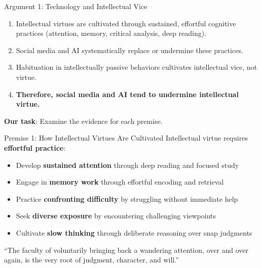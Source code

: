 ﻿\documentclass[aspectratio=169,11pt]{beamer}
\begin{document}
\begin{frame}{Argument 1: Technology and Intellectual Vice}
\begin{argumentbox}
\begin{enumerate}
    \item Intellectual virtues are cultivated through sustained, effortful cognitive practices (attention, memory, critical analysis, deep reading).
    \item Social media and AI systematically replace or undermine these practices.
    \item Habituation in intellectually passive behaviors cultivates intellectual vice, not virtue.
    \item[\textbf{C.}] \textbf{Therefore, social media and AI tend to undermine intellectual virtue.}
\end{enumerate}
\end{argumentbox}

\vspace{0.3cm}
\textbf{Our task}: Examine the evidence for each premise.
\end{frame}

\begin{frame}{Premise 1: How Intellectual Virtues Are Cultivated}
Intellectual virtue requires \textbf{effortful practice}:

\begin{itemize}
    \item Develop \textbf{sustained attention} through deep reading and focused study
    \item Engage in \textbf{memory work} through effortful encoding and retrieval
    \item Practice \textbf{confronting difficulty} by struggling without immediate help
    \item Seek \textbf{diverse exposure} by encountering challenging viewpoints
    \item Cultivate \textbf{slow thinking} through deliberate reasoning over snap judgments
\end{itemize}

\vspace{0.3cm}
\begin{quotebox}
``The faculty of voluntarily bringing back a wandering attention, over and over again, is the very root of judgment, character, and will.''
\end{quotebox}
\end{frame}
\end{document}
